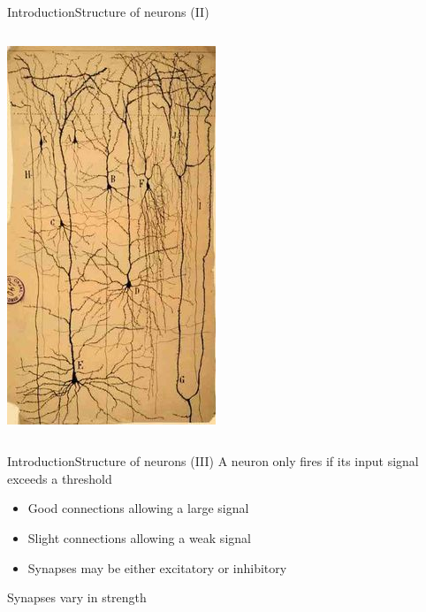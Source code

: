 \documentclass[10pt,compress]{beamer} %
\begin{document}
\begin{frame}{Introduction}{Structure of neurons (II)}
\begin{columns}
		\includegraphics[width=\linewidth]{figs/neuron-ryc.jpg}
	   \end{columns}
\end{frame}

\begin{frame}{Introduction}{Structure of neurons (III)}
	A neuron only fires if its input signal exceeds a threshold
	\begin{itemize}
	\item Good connections allowing a large signal
	\item Slight connections allowing a weak signal
	\item Synapses may be either excitatory or inhibitory
	\end{itemize}
	Synapses vary in strength
\end{frame}
\end{document}
